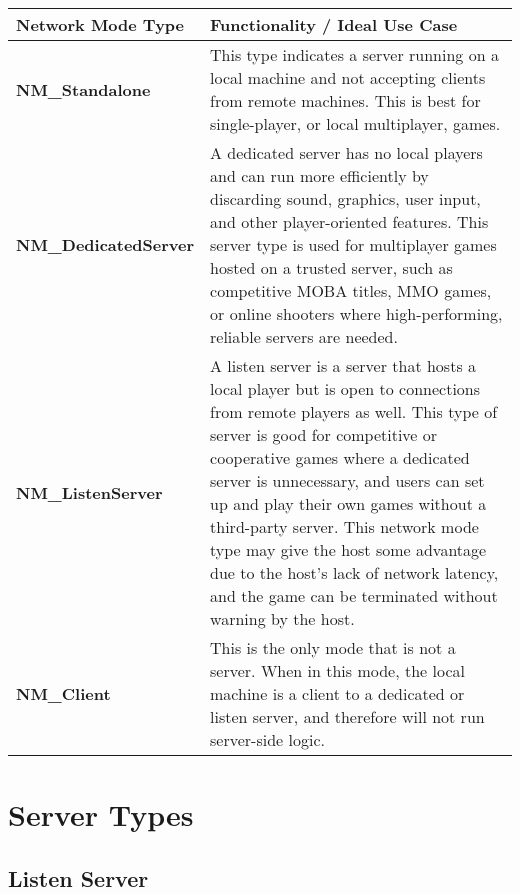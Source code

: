 \documentclass[
  letterpaper,
  DIV=11,
  numbers=noendperiod]{scrartcl}
\begin{document}
\begin{longtable}[]{@{}
  >{\raggedright\arraybackslash}p{}
  >{\raggedright\arraybackslash}p{}@{}}
\toprule\noalign{}
\begin{minipage}[b]{\linewidth}\raggedright
Network Mode Type
\end{minipage} & \begin{minipage}[b]{\linewidth}\raggedright
Functionality / Ideal Use Case
\end{minipage} \\
\midrule\noalign{}
\endhead
\bottomrule\noalign{}
\endlastfoot
\textbf{NM\_Standalone} & This type indicates a server running on a
local machine and not accepting clients from remote machines. This is
best for single-player, or local multiplayer, games. \\
\textbf{NM\_DedicatedServer} & A dedicated server has no local players
and can run more efficiently by discarding sound, graphics, user input,
and other player-oriented features. This server type is used for
multiplayer games hosted on a trusted server, such as competitive MOBA
titles, MMO games, or online shooters where high-performing, reliable
servers are needed. \\
\textbf{NM\_ListenServer} & A listen server is a server that hosts a
local player but is open to connections from remote players as well.
This type of server is good for competitive or cooperative games where a
dedicated server is unnecessary, and users can set up and play their own
games without a third-party server. This network mode type may give the
host some advantage due to the host's lack of network latency, and the
game can be terminated without warning by the host. \\
\textbf{NM\_Client} & This is the only mode that is not a server. When
in this mode, the local machine is a client to a dedicated or listen
server, and therefore will not run server-side logic. \\
\end{longtable}

\section{Server Types}\label{server-types}

\subsection{Listen Server}\label{listen-server}
\end{document}
